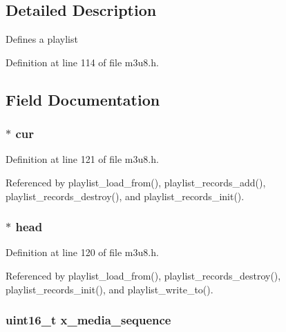 \subsection{\-Detailed \-Description}
\-Defines a playlist 

\-Definition at line 114 of file m3u8.\-h.



\subsection{\-Field \-Documentation}
\hypertarget{struct_playlist_a0d3665b271a9105ad516c49c5572c77b}{
\subsubsection[{cur}]{$\ast$ {\bf cur}}}\label{struct_playlist_a0d3665b271a9105ad516c49c5572c77b}


\-Definition at line 121 of file m3u8.\-h.



\-Referenced by playlist\-\_\-load\-\_\-from(), playlist\-\_\-records\-\_\-add(), playlist\-\_\-records\-\_\-destroy(), and playlist\-\_\-records\-\_\-init().

\hypertarget{struct_playlist_adbbc6e0a2881880caf79e9b2d0ee9d09}{
\subsubsection[{head}]{$\ast$ {\bf head}}}\label{struct_playlist_adbbc6e0a2881880caf79e9b2d0ee9d09}


\-Definition at line 120 of file m3u8.\-h.



\-Referenced by playlist\-\_\-load\-\_\-from(), playlist\-\_\-records\-\_\-destroy(), playlist\-\_\-records\-\_\-init(), and playlist\-\_\-write\-\_\-to().

\hypertarget{struct_playlist_a5777a3f8846ff7f63461d4a0bad7ad09}{
\subsubsection[{x\-\_\-media\-\_\-sequence}]{\setlength{\rightskip}{0pt plus 5cm}uint16\-\_\-t {\bf x\-\_\-media\-\_\-sequence}}}\label{struct_playlist_a5777a3f8846ff7f63461d4a0bad7ad09}


